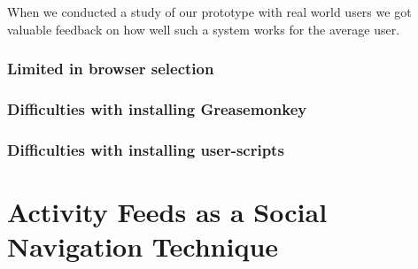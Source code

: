 When we conducted a study of our prototype with real world users
we got valuable feedback on how well such a system works for the average user.


\subsubsection{Limited in browser selection}

\subsubsection{Difficulties with installing Greasemonkey}

\subsubsection{Difficulties with installing user-scripts}


\section{Activity Feeds as a Social Navigation Technique}
